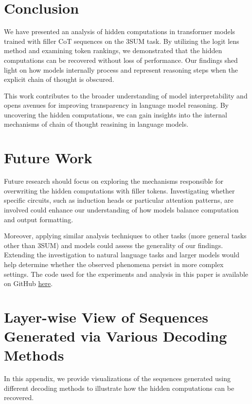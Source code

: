\documentclass{article}
\begin{document}
\newpage
\section{Conclusion}

We have presented an analysis of hidden computations in transformer models trained with filler CoT sequences on the 3SUM task. By utilizing the logit lens method and examining token rankings, we demonstrated that the hidden computations can be recovered without loss of performance. Our findings shed light on how models internally process and represent reasoning steps when the explicit chain of thought is obscured.

This work contributes to the broader understanding of model interpretability and opens avenues for improving transparency in language model reasoning. By uncovering the hidden computations, we can gain insights into the internal mechanisms of chain of thought reasining in language models.

\section{Future Work}

Future research should focus on exploring the mechanisms responsible for overwriting the hidden computations with filler tokens. Investigating whether specific circuits, such as induction heads or particular attention patterns, are involved could enhance our understanding of how models balance computation and output formatting.

Moreover, applying similar analysis techniques to other tasks (more general tasks other than 3SUM) and models could assess the generality of our findings. Extending the investigation to natural language tasks and larger models would help determine whether the observed phenomena persist in more complex settings.
\vfill
The code used for the experiments and analysis in this paper is available on GitHub \href{https://github.com/rokosbasilisk/filler_tokens}{here}.
\newpage
\appendix

\section{Layer-wise View of Sequences Generated via Various Decoding Methods}

In this appendix, we provide visualizations of the sequences generated using different decoding methods to illustrate how the hidden computations can be recovered.
\end{document}
